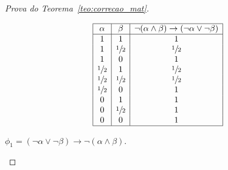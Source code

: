 \begin{proof}[Prova do Teorema~\ref{teo:correcao_mat}]
\begin{provaporcasos}
\begin{provaporsubcasos}
    
                    \begin{center}
                        \[
                            \begin{array}{|c|c|c|}%
                                \hline%
                                \alpha      & \beta & \neg(\alpha \land \beta) \to (\neg \alpha \lor \neg \beta) \\
                                \hline%
                                1 & 1 & 1\\
                                1 & \meio{} & \meio{}\\
                                1 & 0 & 1\\
                                \meio{} & 1 & \meio{}\\
                                \meio{} & \meio{} &\meio{}\\ 
                                \meio{} & 0 & 1\\
                                0 & 1 & 1\\
                                0 & \meio{} & 1\\
                                0 & 0 & 1\\
                                \hline%
                            \end{array}
                        \]
                    \end{center}
                    
                

                    \subcasodeprova{} $\phi_{1} = (\neg \alpha \lor \neg \beta) \to \neg (\alpha \land \beta)$. 
    

\end{provaporsubcasos}
\end{provaporcasos}
\end{proof}
